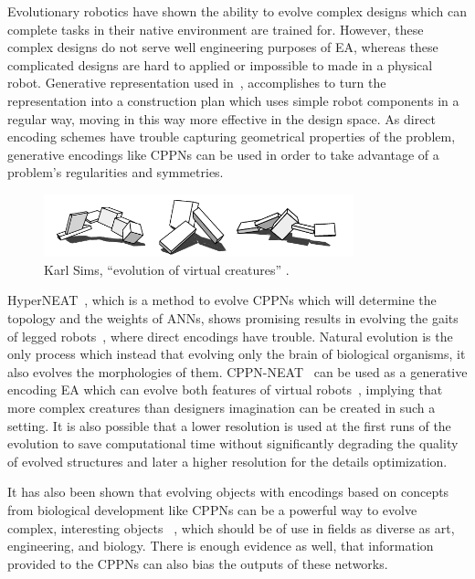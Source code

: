 Evolutionary robotics have shown the ability to evolve complex designs which can complete tasks in their native environment are trained for. However, these complex designs do not serve well engineering purposes of EA, whereas these complicated designs are hard to applied or impossible to made in a physical robot. Generative representation used in~\cite{hornby2003generative}, accomplishes to turn the representation into a construction plan which uses simple robot components in a regular way, moving in this way more effective in the design space. As direct encoding schemes have trouble capturing geometrical properties of the problem, generative encodings like CPPNs can be used in order to take advantage of a problem's regularities and symmetries. 

\begin{figure}[t!]
\centering
\includegraphics[width=0.8\textwidth]{../Figures/Misc/evolvingVirtualCreatures.png}
\caption{Karl Sims, ``evolution of virtual creatures'' \cite{sims1994evolving}.}
\label{fig:karlSims}
\end{figure}

HyperNEAT~\cite{stanley2009hypercube}, which is a method to evolve CPPNs which will determine the topology and the weights of ANNs, shows promising results in evolving the gaits of legged robots~\cite{clune2009evolving}, where direct encodings have trouble. Natural evolution is the only process which instead that evolving only the brain of biological organisms, it also evolves the morphologies of them. CPPN-NEAT~\cite{stanley2007compositional} can be used as a generative encoding EA which can evolve both features of virtual robots~\cite{auerbach2010dynamic, auerbach2010evolving}, implying that more complex creatures than designers imagination can be created in such a setting. It is also possible that a lower resolution is used at the first runs of the evolution to save computational time without significantly degrading the quality of evolved structures and later a higher resolution for the details optimization.

It has also been shown that evolving objects with encodings based on concepts from biological development like CPPNs can be a powerful way to evolve complex, interesting objects~\cite{clune2011evolving} , which should be of use in fields as diverse as art, engineering, and biology. There is enough evidence as well, that information provided to the CPPNs can also bias the outputs of these networks.

